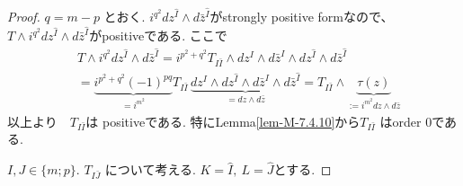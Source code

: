 \begin{proof}
 $q=m-p$ とおく. $ i^{q^2}dz^{\hat I}\wedge d\bar z^{\hat I}$がstrongly positive formなので、
$T\wedge i^{q^2}dz^{\hat I}\wedge d\bar z^{\hat I}$がpositiveである. 
ここで
\begin{equation}
\label{eq-positive-1}
\begin{aligned}
&T\wedge i^{q^2}dz^{\hat I}\wedge d\bar z^{\hat I}
=i^{p^2+q^2} T_{I\bar I}\wedge dz^I\wedge d\bar z^I\wedge dz^{\hat I}\wedge d\bar z^{\hat I} \\
&= \underbrace{i^{p^2+q^2}(-1)^{pq}}_{=i^{m^2}} T_{I\bar I}\, \underbrace{dz^I\wedge dz^{\hat I}\wedge d\bar z^I\wedge d\bar z^{\hat I}}_{=dz\wedge d\bar z} = T_{I\bar I}\wedge \underbrace{\tau(z)}_{:= i^{m^2}dz\wedge d\bar z}
\end{aligned}
\end{equation}
以上より$\quad T_{I\bar I}$は positiveである. 
特にLemma\ref{lem-M-7.4.10}から$T_{I\bar I}$ はorder $0$である. 

$I,J\in \{ m; p\}$. $T_{I\bar J}$ について考える.
$K=\hat I,\ L=\hat J$とする. 



\end{proof}
